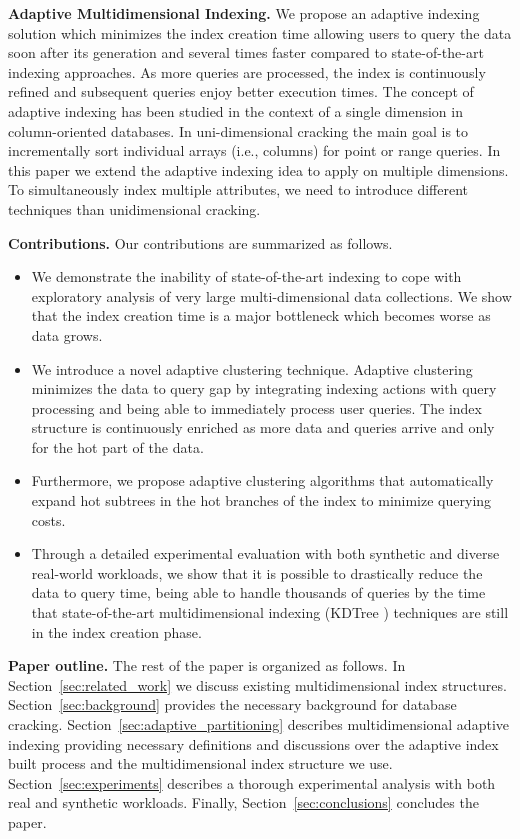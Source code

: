 \textbf{Adaptive Multidimensional Indexing.}
We propose an adaptive indexing solution which minimizes the index 
creation time allowing users to query the data soon after its generation
and several times faster compared to state-of-the-art indexing approaches.  
As more queries are processed, the index is continuously refined and
subsequent queries enjoy better execution times. 
The concept of adaptive indexing has been studied in the context
of a single dimension in column-oriented databases.
In uni-dimensional cracking the main goal is to incrementally sort
individual arrays (i.e., columns) for point or range queries.
In this paper we extend the adaptive indexing idea to apply on multiple
dimensions. To  simultaneously index multiple attributes,
we need to introduce different techniques than unidimensional cracking.

\textbf{Contributions.} Our contributions are summarized as follows.
\begin{itemize}
  \setlength{\itemsep}{0pt}
  \setlength{\parskip}{0pt}
  \setlength{\parsep}{0pt}
\item We demonstrate the inability of state-of-the-art indexing to cope with exploratory analysis of very large multi-dimensional data collections. We show that the index creation time is a major bottleneck which becomes worse as data grows.
\item We introduce a novel adaptive clustering technique.  Adaptive clustering minimizes the data to query gap by integrating indexing actions with query processing and being able to immediately process user queries.
The index structure is continuously enriched as more data and queries arrive and only for the hot part of the data.
\item Furthermore,  we  propose adaptive clustering algorithms that automatically expand hot subtrees in the hot branches of the index to minimize querying costs.
\item Through a detailed experimental evaluation with both synthetic and diverse real-world workloads, we show that it is possible to drastically reduce the data to query time, being able to handle thousands of queries by the time that state-of-the-art multidimensional indexing (KDTree \cite{DBLP:journals/cacm/Bentley75}) techniques are still in the index creation phase.
\end{itemize}

\textbf{Paper outline.}
The rest of the paper is organized as follows.
In Section~\ref{sec:related_work} we discuss existing multidimensional index structures.
Section~\ref{sec:background} provides the necessary background for database cracking.
Section~\ref{sec:adaptive_partitioning} describes multidimensional adaptive indexing 
providing necessary definitions and discussions over the adaptive index built process 
and the multidimensional index structure we use.
Section~\ref{sec:experiments} describes a thorough experimental analysis with both 
real and synthetic workloads.
Finally, Section~\ref{sec:conclusions} concludes the paper.

